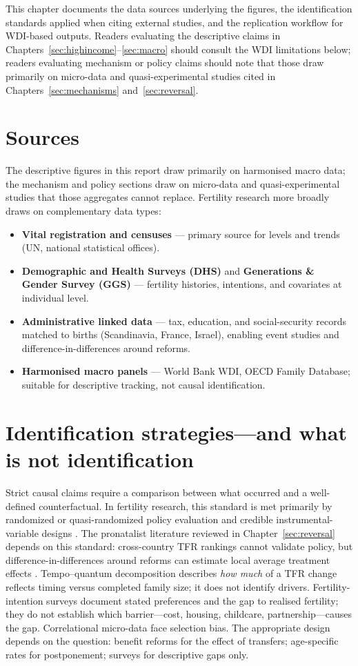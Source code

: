 \documentclass[11pt,a4paper,openany]{book}
\begin{document}
This chapter documents the data sources underlying the figures, the identification standards applied when citing external studies, and the replication workflow for WDI-based outputs. Readers evaluating the descriptive claims in Chapters~\ref{sec:highincome}--\ref{sec:macro} should consult the WDI limitations below; readers evaluating mechanism or policy claims should note that those draw primarily on micro-data and quasi-experimental studies cited in Chapters~\ref{sec:mechanisms} and~\ref{sec:reversal}.

\section{Sources}
The descriptive figures in this report draw primarily on harmonised macro data; the mechanism and policy sections draw on micro-data and quasi-experimental studies that those aggregates cannot replace. Fertility research more broadly draws on complementary data types:
\begin{itemize}
  \item \textbf{Vital registration and censuses} --- primary source for levels and trends (UN, national statistical offices).
  \item \textbf{Demographic and Health Surveys (DHS)} and \textbf{Generations \& Gender Survey (GGS)} --- fertility histories, intentions, and covariates at individual level.
  \item \textbf{Administrative linked data} --- tax, education, and social-security records matched to births (Scandinavia, France, Israel), enabling event studies and difference-in-differences around reforms.
  \item \textbf{Harmonised macro panels} --- World Bank WDI, OECD Family Database; suitable for descriptive tracking, not causal identification.
\end{itemize}

\section{Identification strategies---and what is not identification}

Strict causal claims require a comparison between what occurred and a well-defined counterfactual. In fertility research, this standard is met primarily by randomized or quasi-randomized policy evaluation and credible instrumental-variable designs \citep{doepke2023}. The pronatalist literature reviewed in Chapter~\ref{sec:reversal} depends on this standard: cross-country TFR rankings cannot validate policy, but difference-in-differences around reforms can estimate local average treatment effects \citep{milligan2005,azmat2010,stichnoth2015}. Tempo--quantum decomposition \citep{bongaarts1998} describes \emph{how much} of a TFR change reflects timing versus completed family size; it does not identify drivers. Fertility-intention surveys document stated preferences and the gap to realised fertility; they do not establish which barrier---cost, housing, childcare, partnership---causes the gap. Correlational micro-data face selection bias. The appropriate design depends on the question: benefit reforms for the effect of transfers; age-specific rates for postponement; surveys for descriptive gaps only.
\end{document}
